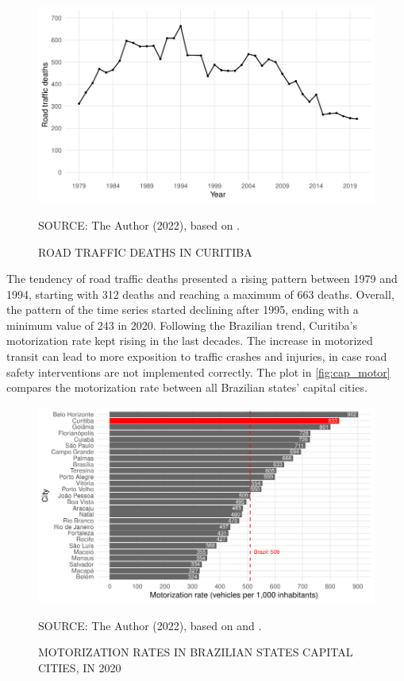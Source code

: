 \begin{figure}[!htbp]
    \centering\footnotesize
    \captionsetup{font=footnotesize}
    \caption{ROAD TRAFFIC DEATHS IN CURITIBA}
    \includegraphics{fig/cwb_abs.pdf}
    \label{fig:cwb_abs}
    \par SOURCE: The Author (2022), based on \textcite{MinistryofHealth2022}.
\end{figure}  

The tendency of road traffic deaths presented a rising pattern between 1979 and 1994, starting with 312 deaths and reaching a maximum of 663 deaths. Overall, the pattern of the time series started declining after 1995, ending with a minimum value of 243 in 2020. Following the Brazilian trend, Curitiba's motorization rate kept rising in the last decades. The increase in motorized transit can lead to more exposition to traffic crashes and injuries, in case road safety interventions are not implemented correctly. The plot in \autoref{fig:cap_motor} compares the motorization rate between all Brazilian states' capital cities.    

\begin{figure}[!htbp]
    \centering\footnotesize
    \captionsetup{font=footnotesize}
    \caption{MOTORIZATION RATES IN BRAZILIAN STATES CAPITAL CITIES, IN 2020}
    \includegraphics{fig/cap_motor.pdf}
    \label{fig:cap_motor}
    \par SOURCE: The Author (2022), based on \textcite{MinistryofHealth2022} and \textcite{DENATRAN2020}.
\end{figure}   

